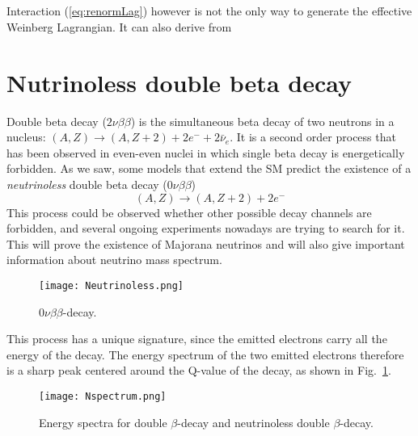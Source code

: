 \documentclass{subnucbo}
\begin{document}
\subsection{}
Interaction (\ref{eq:renormLag}) however is not the only way to generate the effective Weinberg Lagrangian. It can also derive from 

\section{Nutrinoless double beta decay}
Double beta decay ($2\nu\beta\beta$) is the simultaneous beta decay of two neutrons in a nucleus: $(A, Z)\rightarrow(A, Z+2)+2e^-+2\bar{\nu}_e$.
It is a second order process that has been observed in even-even nuclei in which single beta decay is energetically forbidden. As we saw, some models that extend the SM predict the existence of a \emph{neutrinoless} double beta decay ($0\nu\beta\beta$)
\begin{equation}
(A, Z)\rightarrow(A, Z+2)+2e^-
\end{equation}
This process could be observed whether other possible decay channels are forbidden, and several ongoing experiments nowadays are trying to search for it. This will prove the existence of Majorana neutrinos and will also give important information about neutrino mass spectrum.
\begin{wrapfigure}{l}
{0.35\textwidth}
\texttt{[image: Neutrinoless.png]}
\caption{$0\nu\beta\beta$-decay.}
\vspace{-10pt}
\end{wrapfigure}
This process has a unique signature, since the emitted electrons carry all the energy of the decay. The energy spectrum of the two emitted electrons therefore is a sharp peak centered around the Q-value of the decay, as shown in Fig.~\ref{fig:Nspectrum}.
\begin{figure}
\centering
\texttt{[image: Nspectrum.png]}
\caption{Energy spectra for double $\beta$-decay and neutrinoless double $\beta$-decay.}
\label{fig:Nspectrum}
\end{figure}
\end{document}
